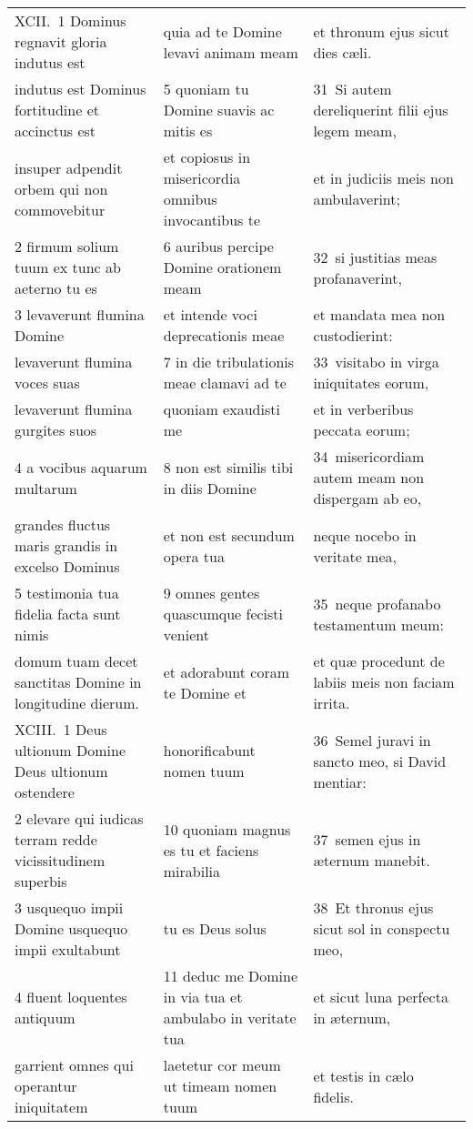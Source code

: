 \documentclass{article}
\begin{document}
\begin{longtable}{@{}p{}p{}p{}@{}}
XCII. 1 Dominus regnavit gloria indutus est	&	quia ad te Domine levavi animam meam	&	et thronum ejus sicut dies cæli.	\\
indutus est Dominus fortitudine et accinctus est	&	5 quoniam tu Domine suavis ac mitis es	&	31 Si autem dereliquerint filii ejus legem meam,	\\
insuper adpendit orbem qui non commovebitur	&	et copiosus in misericordia omnibus invocantibus te	&	et in judiciis meis non ambulaverint;	\\
2 firmum solium tuum ex tunc ab aeterno tu es	&	6 auribus percipe Domine orationem meam	&	32 si justitias meas profanaverint,	\\
3 levaverunt flumina Domine	&	et intende voci deprecationis meae	&	et mandata mea non custodierint:	\\
levaverunt flumina voces suas	&	7 in die tribulationis meae clamavi ad te	&	33 visitabo in virga iniquitates eorum,	\\
levaverunt flumina gurgites suos	&	quoniam exaudisti me	&	et in verberibus peccata eorum;	\\
4 a vocibus aquarum multarum	&	8 non est similis tibi in diis Domine	&	34 misericordiam autem meam non dispergam ab eo,	\\
grandes fluctus maris grandis in excelso Dominus	&	et non est secundum opera tua	&	neque nocebo in veritate mea,	\\
5 testimonia tua fidelia facta sunt nimis	&	9 omnes gentes quascumque fecisti venient	&	35 neque profanabo testamentum meum:	\\
domum tuam decet sanctitas Domine in longitudine dierum.	&	et adorabunt coram te Domine et	&	et quæ procedunt de labiis meis non faciam irrita.	\\
XCIII. 1 Deus ultionum Domine Deus ultionum ostendere	&	honorificabunt nomen tuum	&	36 Semel juravi in sancto meo, si David mentiar:	\\
2 elevare qui iudicas terram redde vicissitudinem superbis	&	10 quoniam magnus es tu et faciens mirabilia	&	37 semen ejus in æternum manebit.	\\
3 usquequo impii Domine usquequo impii exultabunt	&	tu es Deus solus	&	38 Et thronus ejus sicut sol in conspectu meo,	\\
4 fluent loquentes antiquum	&	11 deduc me Domine in via tua et ambulabo in veritate tua	&	et sicut luna perfecta in æternum,	\\
garrient omnes qui operantur iniquitatem	&	laetetur cor meum ut timeam nomen tuum	&	et testis in cælo fidelis.	\\

\end{longtable}
\end{document}
